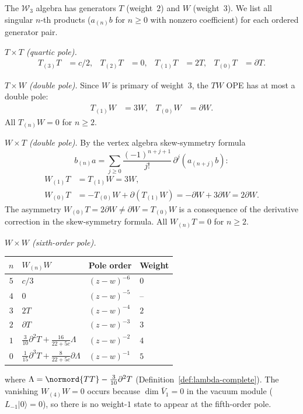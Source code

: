 \begin{computation}\label{comp:w3-nthproducts}
The $\mathcal{W}_3$ algebra has generators $T$ (weight~$2$) and $W$ (weight~$3$).
We list all singular $n$-th products ($a_{(n)}b$ for $n \geq 0$ with nonzero coefficient)
for each ordered generator pair.

\emph{$T \times T$ (quartic pole).}
\begin{align*}
T_{(3)}T &= c/2, & T_{(2)}T &= 0, &
T_{(1)}T &= 2T, & T_{(0)}T &= \partial T.
\end{align*}

\emph{$T \times W$ (double pole).}
Since $W$ is primary of weight~$3$, the $TW$ OPE has at most a double pole:
\begin{align*}
T_{(1)}W &= 3W, & T_{(0)}W &= \partial W.
\end{align*}
All $T_{(n)}W = 0$ for $n \geq 2$.

\emph{$W \times T$ (double pole).}
By the vertex algebra skew-symmetry formula
\[
b_{(n)}a = \sum_{j \geq 0}
\frac{(-1)^{n+j+1}}{j!}\,\partial^j(a_{(n+j)}b)\colon
\]
\begin{align*}
W_{(1)}T &= T_{(1)}W = 3W, \\
W_{(0)}T &= -T_{(0)}W + \partial(T_{(1)}W) = -\partial W + 3\partial W = 2\partial W.
\end{align*}
The asymmetry $W_{(0)}T = 2\partial W \neq \partial W = T_{(0)}W$ is a consequence
of the derivative correction in the skew-symmetry formula.  All $W_{(n)}T = 0$ for $n \geq 2$.

\emph{$W \times W$ (sixth-order pole).}
\begin{center}
\begin{tabular}{clll}
$n$ & $W_{(n)}W$ & Pole order & Weight \\
\hline
$5$ & $c/3$ & $(z\!-\!w)^{-6}$ & $0$ \\
$4$ & $0$ & $(z\!-\!w)^{-5}$ & -- \\
$3$ & $2T$ & $(z\!-\!w)^{-4}$ & $2$ \\
$2$ & $\partial T$ & $(z\!-\!w)^{-3}$ & $3$ \\
$1$ & $\tfrac{3}{10}\partial^2 T + \tfrac{16}{22+5c}\Lambda$ & $(z\!-\!w)^{-2}$ & $4$ \\
$0$ & $\tfrac{1}{15}\partial^3 T + \tfrac{8}{22+5c}\partial\Lambda$ & $(z\!-\!w)^{-1}$ & $5$
\end{tabular}
\end{center}
where $\Lambda = \normord{TT} - \frac{3}{10}\partial^2 T$ (Definition~\ref{def:lambda-complete}).
The vanishing $W_{(4)}W = 0$ occurs because $\dim \bar{V}_1 = 0$ in the vacuum module
($L_{-1}|0\rangle = 0$), so there is no weight-$1$ state to appear at the fifth-order pole.
\end{computation}


